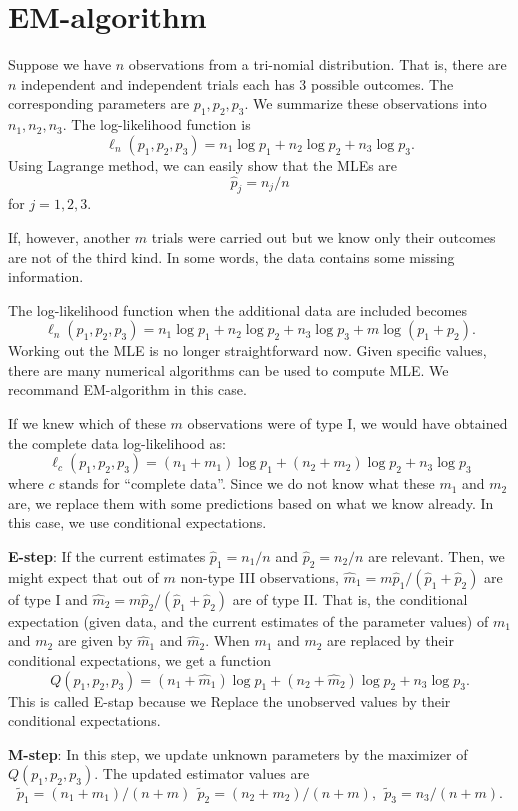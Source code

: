 \section{EM-algorithm}

Suppose we have $n$ observations from a tri-nomial
distribution. That is, there are $n$ independent and
independent trials each has 3 possible outcomes.
The corresponding parameters are $p_1, p_2, p_3$.
We summarize these observations into $n_1, n_2, n_3$.
The log-likelihood function is
\[
\ell_n(p_1, p_2, p_3)
=
n_1 \log p_1 + n_2 \log p_2 + n_3 \log p_3.
\]
Using Lagrange method, we can easily show that the MLEs are
\[
\hat p_j = n_j / n
\]
for $j=1, 2, 3$.

If, however, another $m$ trials were carried out
but we know only their outcomes are not of the third
kind. In some words, the data contains some missing information.

The log-likelihood function when the additional
data are included becomes
\[
\ell_n(p_1, p_2, p_3)
=
n_1 \log p_1 + n_2 \log p_2 + n_3 \log p_3 + m \log(p_1 + p_2).
\]
Working out the MLE is no longer straightforward now.
Given specific values, there are many numerical algorithms
can be used to compute MLE. We recommand
EM-algorithm in this case.

If we knew which of these $m$ observations were
of type I, we would have obtained the complete
data log-likelihood as:
\[
\ell_c(p_1, p_2, p_3)
=
(n_1+m_1) \log p_1 + (n_2+m_2) \log p_2 + n_3 \log p_3
\]
where $c$ stands for ``complete data''.
Since we do not know what these $m_1$ and $m_2$ are,
we replace them with some predictions based on what we know already.
In this case, we use conditional expectations.

\vs
\no
{\bf E-step}:
If the current estimates $\hat p_1= n_1/n$ and
$\hat p_2 = n_2 /n$ are relevant. Then, we might
expect that out of $m$ non-type III observations,
$\hat m_1 = m \hat p_1/(\hat p_1 + \hat p_2)$ are of type I and 
$\hat m_2 = m \hat p_2/(\hat p_1 + \hat p_2)$ are of type II.
That is, the conditional expectation (given
data, and the current estimates of the
parameter values) of $m_1$ and $m_2$
are given by $\hat m_1$ and $\hat m_2$.
When $m_1$ and $m_2$ are replaced by
their conditional expectations, 
we  get a function
\[
Q(p_1, p_2, p_3)
=
(n_1+\hat m_1) \log p_1 + (n_2+\hat m_2) \log p_2 + n_3 \log p_3.
\]
This is called E-stap because we
Replace the unobserved values by their conditional
expectations.

\vs
\no
{\bf M-step}:
In this step, we update unknown parameters by the maximizer of 
$Q(p_1, p_2, p_3)$.
The updated estimator values are
\[
\tilde p_1 = (n_1 + m_1)/(n+m) ~~
\tilde p_2 = (n_2 + m_2)/(n+m), ~~
\tilde p_3 = n_3/(n+m).
\]

